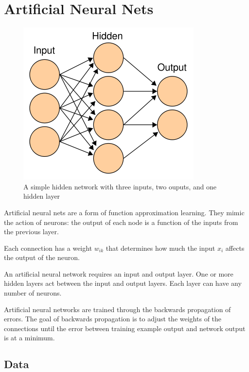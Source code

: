 \documentclass[11pt,a4paper]{article}
\begin{document}
\section{Artificial Neural Nets}
\label{Artificial Neural Nets}

\begin{figure}
  \begin{center}
	\includegraphics[scale=0.4]{neural_network.jpg}
  \end{center}
  \caption{A simple hidden network with three inputs, two ouputs, and one hidden layer}
\end{figure}

Artificial neural nets are a form of function approximation learning. They mimic the action of neurons: the output of each node is a function of the inputs from the previous layer. 

Each connection has a weight $w_{ik}$ that determines how much the input $x_i$ affects the output of the neuron.

An artificial neural network requires an input and output layer. One or more hidden layers act between the input and output layers. Each layer can have any number of neurons. 

Artificial neural networks are trained through the backwards propagation of errors. The goal of backwards propagation is to adjust the weights of the connections until the error between training example output and network output is at a minimum. 

\subsection{Data}
\label{Artificial Neural Nets:Data}
\end{document}

